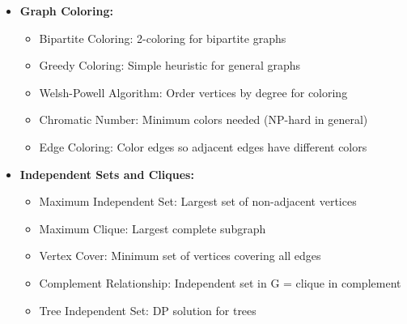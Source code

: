 \documentclass[a4paper,10pt]{book}
\begin{document}
\begin{itemize}[leftmargin=*]
    \item \textbf{Graph Coloring:}
    \begin{itemize}
        \item Bipartite Coloring: 2-coloring for bipartite graphs
        \item Greedy Coloring: Simple heuristic for general graphs
        \item Welsh-Powell Algorithm: Order vertices by degree for coloring
        \item Chromatic Number: Minimum colors needed (NP-hard in general)
        \item Edge Coloring: Color edges so adjacent edges have different colors
    \end{itemize}

    \item \textbf{Independent Sets and Cliques:}
    \begin{itemize}
        \item Maximum Independent Set: Largest set of non-adjacent vertices
        \item Maximum Clique: Largest complete subgraph
        \item Vertex Cover: Minimum set of vertices covering all edges
        \item Complement Relationship: Independent set in G = clique in complement
        \item Tree Independent Set: DP solution for trees
    \end{itemize}
\end{itemize}
\end{document}
